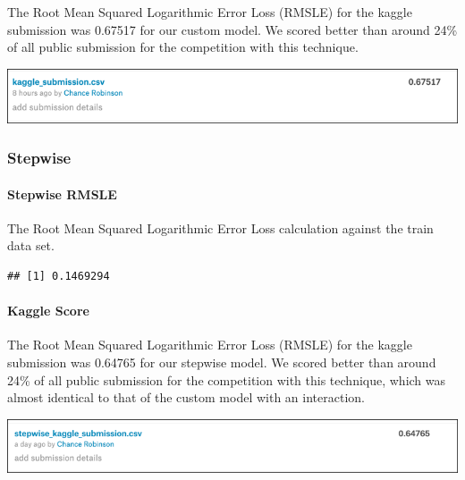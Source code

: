 \documentclass[american,]{article}
\let\oldparagraph\paragraph
\renewcommand{\paragraph}[1]{\oldparagraph{#1}\mbox{}}
\begin{document}
The Root Mean Squared Logarithmic Error Loss (RMSLE) for the kaggle submission was 0.67517 for our custom model. We scored better than around 24\% of all public submission for the competition with this technique.

\label{objective-one:custom-kaggle}

\begin{center}\includegraphics[width=0.9\linewidth]{./images/multiple_linear_regression_custom} \end{center}

\hypertarget{stepwise}{%
\subsubsection{Stepwise}\label{stepwise}}

\hypertarget{stepwise-rmsle}{%
\paragraph{Stepwise RMSLE}\label{stepwise-rmsle}}

The Root Mean Squared Logarithmic Error Loss calculation against the train data set.

\begin{verbatim}
## [1] 0.1469294
\end{verbatim}

\hypertarget{kaggle-score-1}{%
\paragraph{Kaggle Score}\label{kaggle-score-1}}

The Root Mean Squared Logarithmic Error Loss (RMSLE) for the kaggle submission was 0.64765 for our stepwise model. We scored better than around 24\% of all public submission for the competition with this technique, which was almost identical to that of the custom model with an interaction.

\label{objective-one:stepwise-kaggle}

\begin{center}\includegraphics[width=0.9\linewidth]{./images/multiple_linear_regression_stepwise} \end{center}
\end{document}
